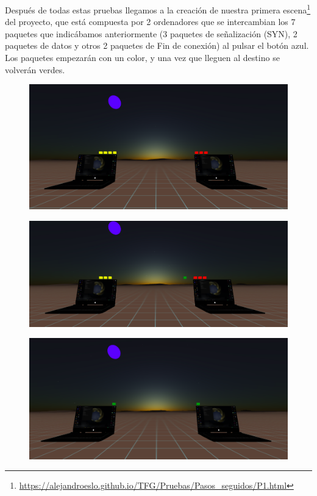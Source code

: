 \documentclass[a4paper, 12pt]{book}
\begin{document}
\newpage
Después de todas estas pruebas llegamos a la creación de nuestra primera escena\footnote{\url{https://alejandroeslo.github.io/TFG/Pruebas/Pasos_seguidos/P1.html}} del proyecto, que está compuesta por 2 ordenadores que se intercambian los 7 paquetes que indicábamos anteriormente (3 paquetes de señalización (SYN), 2 paquetes de datos y otros 2 paquetes de Fin de conexión) al pulsar el botón azul.
Los paquetes empezarán con un color, y una vez que lleguen al destino se volverán verdes.

\begin{figure}[h]
\centering
    \includegraphics[scale=0.33]{img/escenafinal_1.png}
\end{figure}

\begin{figure}[h]
\centering
    \includegraphics[scale=0.33]{img/escenafinal_2.png}
\end{figure}

\begin{figure}[h]
\centering
    \includegraphics[scale=0.35]{img/escenafinal_3.png}
\end{figure}
\end{document}
